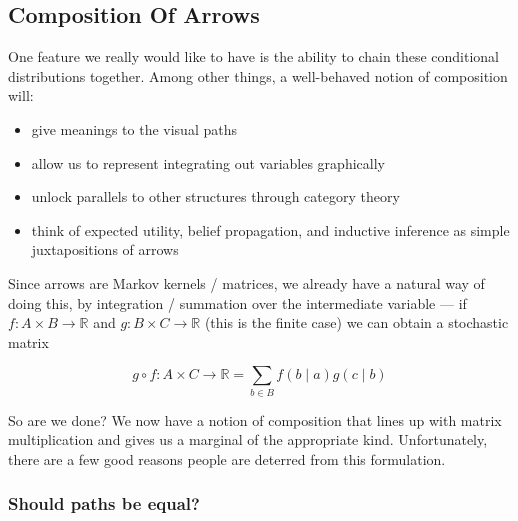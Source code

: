 \documentclass{article}
\begin{document}
	\subsection{Composition Of Arrows}
	One feature we really would like to have is the ability to chain these conditional distributions together. Among other things, a well-behaved notion of composition will:
	\begin{itemize}[nosep]
		\item give meanings to the visual paths
		\item allow us to represent integrating out variables graphically
		\item unlock parallels to other structures through category theory
		\item think of expected utility, belief propagation, and inductive inference as simple juxtapositions of arrows
	\end{itemize} 
	
	Since arrows are Markov kernels / matrices, we already have a natural way of doing this, by integration / summation over the intermediate variable --- if $f : A \times B \to \mathbb R$ and $g : B \times C \to \mathbb R$ (this is the finite case) we can obtain a stochastic matrix
	
	\[ g\circ f : A \times C \to \mathbb R =  \sum_{b \in B} f( b \mid a) g(c \mid b) \]
	
	So are we done? We now have a notion of composition that lines up with matrix multiplication and gives us a marginal of the appropriate kind. Unfortunately, there are a few good reasons people are deterred from this formulation. 
	

	
	\subsubsection{Should paths be equal?}
	
\end{document}
